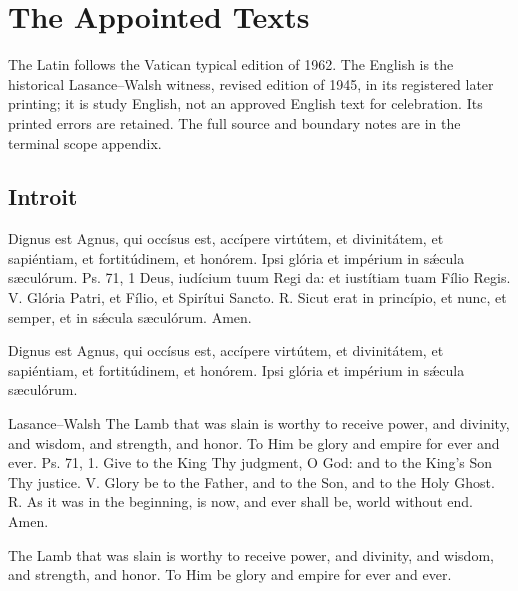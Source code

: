 \clearpage
\section{The Appointed Texts}
The Latin follows the Vatican typical edition of 1962. The English is the historical Lasance--Walsh witness, revised edition of 1945, in its registered later printing; it is study English, not an approved English text for celebration. Its printed errors are retained. The full source and boundary notes are in the terminal scope appendix.

\subsection{Introit}
\label{proper-introit}
\begin{latinproper}
Dignus est Agnus, qui occísus est, accípere virtútem, et divinitátem, et sapiéntiam, et fortitúdinem, et honórem. Ipsi glória et impérium in sǽcula sæculórum. \textnormal{Ps. 71, 1} Deus, iudícium tuum Regi da: et iustítiam tuam Fílio Regis. \textnormal{V.} Glória Patri, et Fílio, et Spirítui Sancto. \textnormal{R.} Sicut erat in princípio, et nunc, et semper, et in sǽcula sæculórum. Amen.

Dignus est Agnus, qui occísus est, accípere virtútem, et divinitátem, et sapiéntiam, et fortitúdinem, et honórem. Ipsi glória et impérium in sǽcula sæculórum.
\end{latinproper}
\begin{englishwitness}{Lasance--Walsh}
The Lamb that was slain is worthy to receive power, and divinity, and wisdom, and strength, and honor. To Him be glory and empire for ever and ever. \textnormal{Ps. 71, 1.} Give to the King Thy judgment, O God: and to the King's Son Thy justice. \textnormal{V.} Glory be to the Father, and to the Son, and to the Holy Ghost. \textnormal{R.} As it was in the beginning, is now, and ever shall be, world without end. Amen.

The Lamb that was slain is worthy to receive power, and divinity, and wisdom, and strength, and honor. To Him be glory and empire for ever and ever.
\end{englishwitness}
